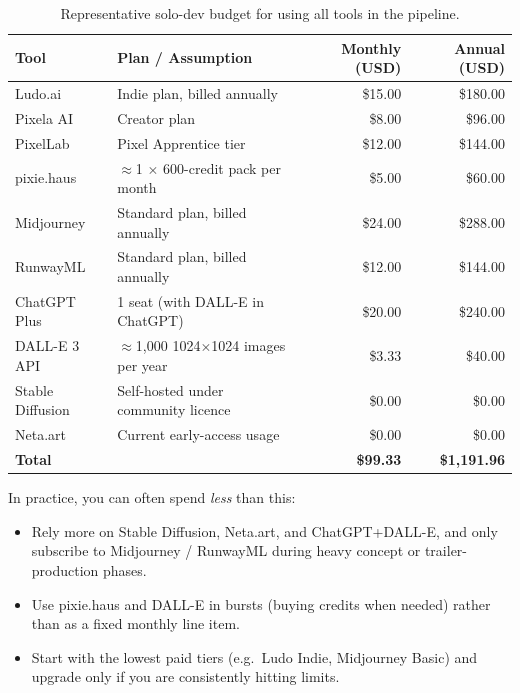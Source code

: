 \documentclass[11pt]{article}
\begin{document}
\begin{table}[htbp]
    \centering
    \begin{tabular}{p{3.2cm}p{5.3cm}rr}
        \toprule
        \textbf{Tool} & \textbf{Plan / Assumption} & \textbf{Monthly (USD)} & \textbf{Annual (USD)} \\
        \midrule
        Ludo.ai & Indie plan, billed annually & \$15.00 & \$180.00 \\
        Pixela AI & Creator plan & \$8.00 & \$96.00 \\
        PixelLab & Pixel Apprentice tier & \$12.00 & \$144.00 \\
        pixie.haus & $\approx$1 $\times$ 600-credit pack per month & \$5.00 & \$60.00 \\
        Midjourney & Standard plan, billed annually & \$24.00 & \$288.00 \\
        RunwayML & Standard plan, billed annually & \$12.00 & \$144.00 \\
        ChatGPT Plus & 1 seat (with DALL-E in ChatGPT) & \$20.00 & \$240.00 \\
        DALL-E 3 API & $\approx$1{,}000 1024$\times$1024 images per year & \$3.33 & \$40.00 \\
        Stable Diffusion & Self-hosted under community licence & \$0.00 & \$0.00 \\
        Neta.art & Current early-access usage & \$0.00 & \$0.00 \\
        \midrule
        \textbf{Total} & & \textbf{\$99.33} & \textbf{\$1{,}191.96} \\
        \bottomrule
    \end{tabular}
    \caption{Representative solo-dev budget for using all tools in the pipeline.}
    \label{tab:annual-cost}
\end{table}

In practice, you can often spend \emph{less} than this:

\begin{itemize}
    \item Rely more on Stable Diffusion, Neta.art, and ChatGPT+DALL-E, and only subscribe to Midjourney / RunwayML during heavy concept or trailer-production phases.
    \item Use pixie.haus and DALL-E in bursts (buying credits when needed) rather than as a fixed monthly line item.
    \item Start with the lowest paid tiers (e.g.\ Ludo Indie, Midjourney Basic) and upgrade only if you are consistently hitting limits.
\end{itemize}
\end{document}

